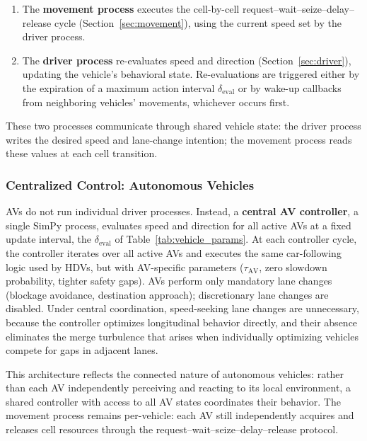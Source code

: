 \documentclass[review,number]{elsarticle}
\begin{document}
\begin{enumerate}
    \item The \textbf{movement process} executes the cell-by-cell request--wait--seize--delay--release cycle (Section~\ref{sec:movement}), using the current speed set by the driver process.

    \item The \textbf{driver process} re-evaluates speed and direction (Section~\ref{sec:driver}), updating the vehicle's behavioral state. Re-evaluations are triggered either by the expiration of a maximum action interval $\delta_{\text{eval}}$ or by wake-up callbacks from neighboring vehicles' movements, whichever occurs first.
\end{enumerate}

These two processes communicate through shared vehicle state: the driver process writes the desired speed and lane-change intention; the movement process reads these values at each cell transition.

\subsubsection{Centralized Control: Autonomous Vehicles}
\label{sec:av_controller}

AVs do not run individual driver processes. Instead, a \textbf{central AV controller}, a single SimPy process, evaluates speed and direction for all active AVs at a fixed update interval, the $\delta_{\text{eval}}$ of Table~\ref{tab:vehicle_params}. At each controller cycle, the controller iterates over all active AVs and executes the same car-following logic used by HDVs, but with AV-specific parameters ($\tau_{\text{AV}}$, zero slowdown probability, tighter safety gaps). AVs perform only mandatory lane changes (blockage avoidance, destination approach); discretionary lane changes are disabled. Under central coordination, speed-seeking lane changes are unnecessary, because the controller optimizes longitudinal behavior directly, and their absence eliminates the merge turbulence that arises when individually optimizing vehicles compete for gaps in adjacent lanes.

This architecture reflects the connected nature of autonomous vehicles: rather than each AV independently perceiving and reacting to its local environment, a shared controller with access to all AV states coordinates their behavior. The movement process remains per-vehicle: each AV still independently acquires and releases cell resources through the request--wait--seize--delay--release protocol.
\end{document}
